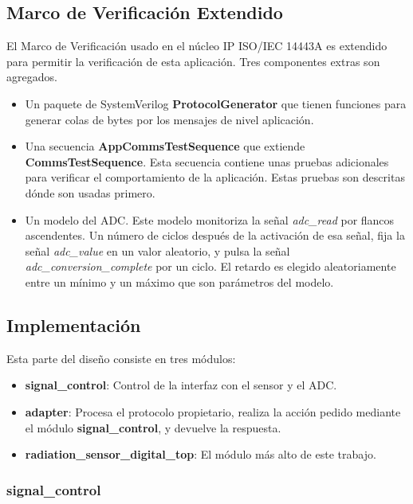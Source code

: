 \documentclass[a4paper, twoside, 11pt]{report}
\begin{document}
\FloatBarrier
\subsection{Marco de Verificación Extendido}

El Marco de Verificación usado en el núcleo IP ISO/IEC 14443A es extendido para permitir la verificación de esta aplicación. Tres componentes extras son agregados.

\begin{itemize}
  \item Un paquete de SystemVerilog \textbf{ProtocolGenerator} que tienen funciones para generar colas de bytes por los mensajes de nivel aplicación.
  \item Una secuencia \textbf{AppCommsTestSequence} que extiende \textbf{CommsTestSequence}. Esta secuencia contiene unas pruebas adicionales para verificar el comportamiento de la aplicación. Estas pruebas son descritas dónde son usadas primero.
  \item Un modelo del ADC. Este modelo monitoriza la señal \textit{adc\_read} por flancos ascendentes. Un número de ciclos después de la activación de esa señal, fija la señal \textit{adc\_value} en un valor aleatorio, y pulsa la señal \textit{adc\_conversion\_complete} por un ciclo. El retardo es elegido aleatoriamente entre un mínimo y un máximo que son parámetros del modelo.
\end{itemize}

\FloatBarrier
\subsection{Implementación}

Esta parte del diseño consiste en tres módulos:

\begin{itemize}
  \item \textbf{signal\_control}: Control de la interfaz con el sensor y el ADC.
  \item \textbf{adapter}: Procesa el protocolo propietario, realiza la acción pedido mediante el módulo \textbf{signal\_control}, y devuelve la respuesta.
  \item \textbf{radiation\_sensor\_digital\_top}: El módulo más alto de este trabajo.
\end{itemize}

\FloatBarrier
\subsubsection{signal\_control}
\end{document}
